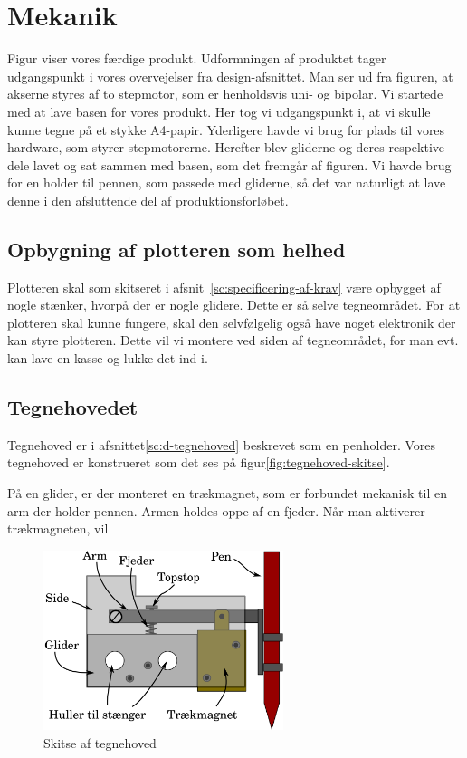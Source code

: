 \chapter[Implementering af mekanik]{Mekanik}


Figur  viser vores færdige produkt.  Udformningen
af produktet tager udgangspunkt i vores overvejelser fra
design-afsnittet.  Man ser ud fra figuren, at akserne styres af to
stepmotor, som er henholdsvis uni- og bipolar.  Vi startede med at
lave basen for vores produkt. Her tog vi udgangspunkt i, at vi skulle
kunne tegne på et stykke A4-papir. Yderligere havde vi brug for plads
til vores hardware, som styrer stepmotorerne. Herefter blev gliderne
og deres respektive dele lavet og sat sammen med basen, som det
fremgår af figuren. Vi havde brug for en holder til pennen, som
passede med gliderne, så det var naturligt at lave denne i den
afsluttende del af produktionsforløbet.

\section{Opbygning af plotteren som helhed}
Plotteren skal som skitseret i afsnit~\vref{sc:specificering-af-krav}
være opbygget af nogle stænker, hvorpå der er nogle glidere. Dette er
så selve tegneområdet. For at plotteren skal kunne fungere, skal den
selvfølgelig også have noget elektronik der kan styre plotteren. Dette
vil vi montere ved siden af tegneområdet, for man evt. kan lave en
kasse og lukke det ind i.


\section{Tegnehovedet}
\label{sc:i-tegnehovedet}
Tegnehoved er i afsnittet\vref{sc:d-tegnehoved} beskrevet som en
penholder. Vores tegnehoved er konstrueret som det ses på
figur\vref{fig:tegnehoved-skitse}.

På en glider, er der monteret en trækmagnet, som er forbundet mekanisk
til en arm der holder pennen. Armen holdes oppe af en fjeder. Når man
aktiverer trækmagneten, vil

\begin{figure}[htbp]
  \centering
  \includegraphics[width=7cm]{./img/tegnehoved-skitse}
  \caption{Skitse af tegnehoved}
  \label{fig:tegnehoved-skitse}
\end{figure}


